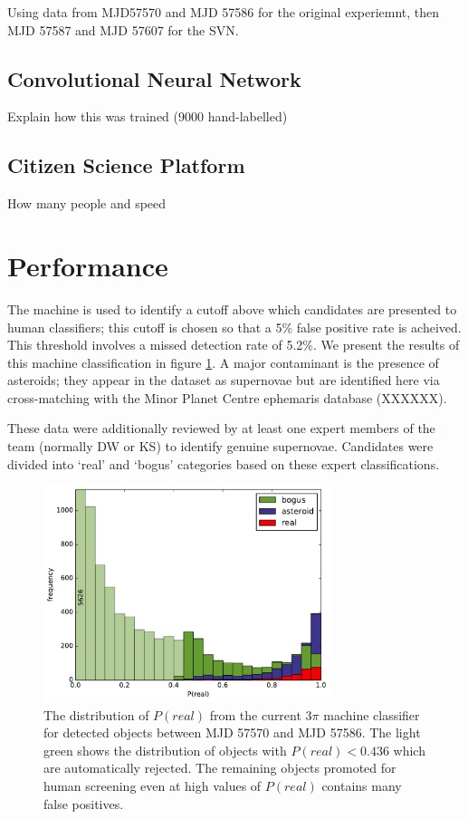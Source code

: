 \documentclass[a4paper,fleqn,usenatbib]{mnras}
\begin{document}
Using data from MJD57570 and MJD 57586 for the original experiemnt, then MJD 57587 and MJD 57607 for the SVN.

\subsection{Convolutional Neural Network}

Explain how this was trained (9000 hand-labelled) 
\subsection{Citizen Science Platform}

How many people and speed 

\section{Performance}

The machine is used to identify a cutoff above which candidates are presented to human classifiers; this cutoff is chosen so that a 5\% false positive rate is acheived. This threshold involves a missed detection rate of 5.2\%. We present the results of this machine classification in figure \ref{fig:machine_dist}. A major contaminant is the presence of asteroids; they appear in the dataset as supernovae but are identified here via cross-matching with the Minor Planet Centre ephemaris database (XXXXXX). 

These data were additionally reviewed by at least one expert members of the team (normally DW or KS) to identify genuine supernovae. Candidates were divided into `real' and `bogus' categories based on these expert classifications. 

\begin{figure}
   \includegraphics[width=84mm]{figs/machine_hist.pdf}
   \caption{The distribution of $P(real)$ from the current 3$\pi$ machine classifier 
            for detected objects between MJD 57570 and MJD 57586.  The light green shows the distribution of 
            objects with $P(real) < 0.436$ which are automatically rejected.  The remaining 
            objects promoted for human screening even at high values of $P(real)$ contains
            many false positives.} 
   \label{fig:machine_dist} 
\end{figure}
\end{document}
